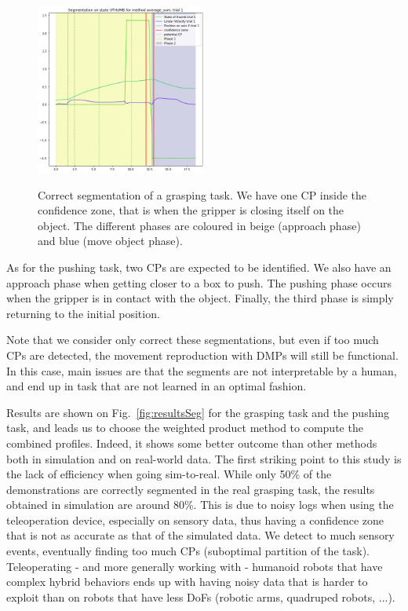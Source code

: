 \documentclass[conference]{IEEEtran}
\begin{document}
\begin{figure}[ht]
  \centering
  \includegraphics[width=0.5\textwidth,height=2.5in]{img/resolSeg.png}
  \caption{Correct segmentation of a grasping task. We have one CP inside the confidence zone, that is when the gripper is closing itself on the object. The different phases are coloured in beige (approach phase) and blue (move object phase).}
  \label{fig:coloredseg}
\end{figure}

As for the pushing task, two CPs are expected to be identified. We also have an approach phase when getting closer to a box to push. The pushing phase occurs when the gripper is in contact with the object. Finally, the third phase is simply returning to the initial position.

Note that we consider only correct these segmentations, but even if too much CPs are detected, the movement reproduction with DMPs will still be functional. In this case, main issues are that the segments are not interpretable by a human, and end up in task that are not learned in an optimal fashion.


Results are shown on Fig.~\ref{fig:resultsSeg} for the grasping task and the pushing task, and leads us to choose the weighted product method to compute the combined profiles. Indeed, it shows some better outcome than other methods both in simulation and on real-world data. The first striking point to this study is the lack of efficiency when going sim-to-real. While only 50\% of the demonstrations are correctly segmented in the real grasping task, the results obtained in simulation are around 80\%. This is due to noisy logs when using the teleoperation device, especially on sensory data, thus having a confidence zone that is not as accurate as that of the simulated data. We detect to much sensory events, eventually finding too much CPs (suboptimal partition of the task). Teleoperating - and more generally working with - humanoid robots that have complex hybrid behaviors ends up with having noisy data that is harder to exploit than on robots that have less DoFs (robotic arms, quadruped robots, ...).
\end{document}
